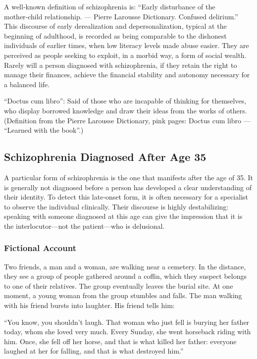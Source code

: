 \documentclass[12pt,oneside]{article}
\begin{document}
A well‑known definition of schizophrenia is: “Early disturbance of the mother‑child relationship. — Pierre Larousse Dictionary. Confused delirium.” This discourse of early derealization and depersonalization, typical at the beginning of adulthood, is recorded as being comparable to the dishonest individuals of earlier times, when low literacy levels made abuse easier. They are perceived as people seeking to exploit, in a morbid way, a form of social wealth. Rarely will a person diagnosed with schizophrenia, if they retain the right to manage their finances, achieve the financial stability and autonomy necessary for a balanced life.

“Doctus cum libro”: Said of those who are incapable of thinking for themselves, who display borrowed knowledge and draw their ideas from the works of others. (Definition from the Pierre Larousse Dictionary, pink pages: Doctus cum libro — “Learned with the book”.)

\subsection{Schizophrenia Diagnosed After Age 35}

A particular form of schizophrenia is the one that manifests after the age of 35. It is generally not diagnosed before a person has developed a clear understanding of their identity. To detect this late‑onset form, it is often necessary for a specialist to observe the individual clinically. Their discourse is highly destabilizing: speaking with someone diagnosed at this age can give the impression that it is the interlocutor—not the patient—who is delusional.

\subsubsection*{Fictional Account}

Two friends, a man and a woman, are walking near a cemetery. In the distance, they see a group of people gathered around a coffin, which they suspect belongs to one of their relatives. The group eventually leaves the burial site. At one moment, a young woman from the group stumbles and falls. The man walking with his friend bursts into laughter. His friend tells him:

“You know, you shouldn’t laugh. That woman who just fell is burying her father today, whom she loved very much. Every Sunday, she went horseback riding with him. Once, she fell off her horse, and that is what killed her father: everyone laughed at her for falling, and that is what destroyed him.”
\end{document}
